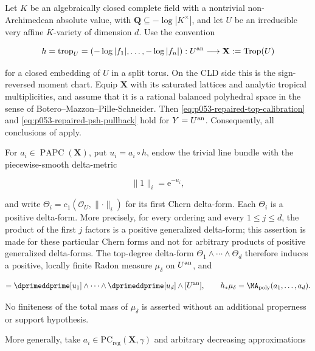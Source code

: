 \begin{corollary}\label{cor:p053-algebraic-chart-repaired-candidate}
Let \(K\) be an algebraically closed complete field with a nontrivial
non-Archimedean absolute value, with
\(\mathbf Q\subseteq-\log|K^\times|\), and let \(U\) be an irreducible very affine
\(K\)-variety of dimension \(d\).  Use the convention

\[
 h=\operatorname{trop}_U=(-\log|f_1|,\ldots,-\log|f_n|):
 U^{\mathrm{an}}\longrightarrow\mathbf X:=\operatorname{Trop}(U)
\]

for a closed embedding of \(U\) in a split torus.  On the CLD side this is
the sign-reversed moment chart.  Equip \(\mathbf X\) with its saturated
lattices and analytic tropical multiplicities, and assume that it is a
rational balanced polyhedral space in the sense of
Botero--Mazzon--Pille-Schneider.  Then
\eqref{eq:p053-repaired-top-calibration} and
\eqref{eq:p053-repaired-psh-pullback} hold for \(Y=U^{\mathrm{an}}\).  Consequently,
all conclusions of
 apply.

For \(a_i\in\operatorname{PAPC}(\mathbf X)\), put \(u_i=a_i\circ h\),
endow the trivial line bundle with the piecewise-smooth delta-metric

\[
 \lVert1\rVert_i=\mathrm e^{-u_i},
\]

and write \(\Theta_i=c_1(\mathcal O_U,\lVert\cdot\rVert_i)\) for its first
Chern delta-form.  Each \(\Theta_i\) is a positive delta-form.  More
precisely, for every ordering and every \(1\leq j\leq d\), the product of
the first \(j\) factors is a positive generalized delta-form; this assertion
is made for these particular Chern forms and not for arbitrary products of
positive generalized delta-forms.  The top-degree delta-form
\(\Theta_1\wedge\cdots\wedge\Theta_d\) therefore induces a positive,
locally finite Radon measure \(\mu_\delta\) on \(U^{\mathrm{an}}\), and

\begin{equation}
 [\mu_\delta]
 =\dprimeddprime[u_1]\wedge\cdots\wedge
   \dprimeddprime[u_d]\wedge[U^{\an}],
 \qquad
 h_*\mu_\delta=\MA_{\mathrm{poly}}(a_1,\ldots,a_d).
 \label{eq:p054-repaired-delta-comparison}
\end{equation}

No finiteness of the total mass of \(\mu_\delta\) is asserted without an
additional properness or support hypothesis.

More generally, take
\(a_i\in\mathrm{PC}_{\mathrm{reg}}(\mathbf X,\gamma)\) and arbitrary
decreasing approximations


\end{corollary}

